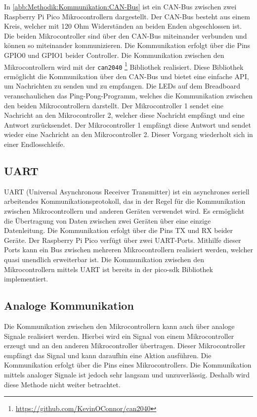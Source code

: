 In \autoref{abb:Methodik:Kommunikation:CAN-Bus} ist ein CAN-Bus zwischen zwei Raspberry Pi Pico Mikrocontrollern dargestellt. Der CAN-Bus besteht aus einem Kreis, welcher mit 120 Ohm Widerständen an beiden Enden abgeschlossen ist. Die beiden Mikrocontroller sind über den CAN-Bus miteinander verbunden und können so miteinander kommunizieren. Die Kommunikation erfolgt über die Pins GPIO0 und GPIO1 beider Controller. Die Kommunikation zwischen den Mikrocontrollern wird mit der \lstinline{can2040} \footnote{\url{https://github.com/KevinOConnor/can2040}} Bibliothek realisiert. Diese Bibliothek ermöglicht die Kommunikation über den CAN-Bus und bietet eine einfache API, um Nachrichten zu senden und zu empfangen. Die LEDs auf dem Breadboard veranschaulichen das Ping-Pong-Programm, welches die Kommunikation zwischen den beiden Mikrocontrollern darstellt. Der Mikrocontroller 1 sendet eine Nachricht an den Mikrocontroller 2, welcher diese Nachricht empfängt und eine Antwort zurücksendet. Der Mikrocontroller 1 empfängt diese Antwort und sendet wieder eine Nachricht an den Mikrocontroller 2. Dieser Vorgang wiederholt sich in einer Endlosschleife.

\subsection{UART}\label{text:Methodik:Kommunikation:UART}

UART (Universal Asynchronous Receiver Transmitter) ist ein asynchrones seriell arbeitendes Kommunikationsprotokoll, das in der Regel für die Kommunikation zwischen Mikrocontrollern und anderen Geräten verwendet wird. Es ermöglicht die Übertragung von Daten zwischen zwei Geräten über eine einzige Datenleitung. Die Kommunikation erfolgt über die Pins TX und RX beider Geräte.
\newline
Der Raspberry Pi Pico verfügt über zwei UART-Ports. Mithilfe dieser Ports kann ein Bus zwischen mehreren Mikrocontrollern realisiert werden, welcher quasi unendlich erweiterbar ist. Die Kommunikation zwischen den Mikrocontrollern mittels UART ist bereits in der pico-sdk Bibliothek implementiert.

\subsection{Analoge Kommunikation}\label{text:Methodik:Kommunikation:Analoge-Kommunikation}

Die Kommunikation zwischen den Mikrocontrollern kann auch über analoge Signale realisiert werden. Hierbei wird ein Signal von einem Mikrocontroller erzeugt und an den anderen Mikrocontroller übertragen. Dieser Mikrocontroller empfängt das Signal und kann daraufhin eine Aktion ausführen. Die Kommunikation erfolgt über die Pins eines Mikrocontrollers. Die Kommunikation mittels analoger Signale ist jedoch sehr langsam und unzuverlässig. Deshalb wird diese Methode nicht weiter betrachtet.

